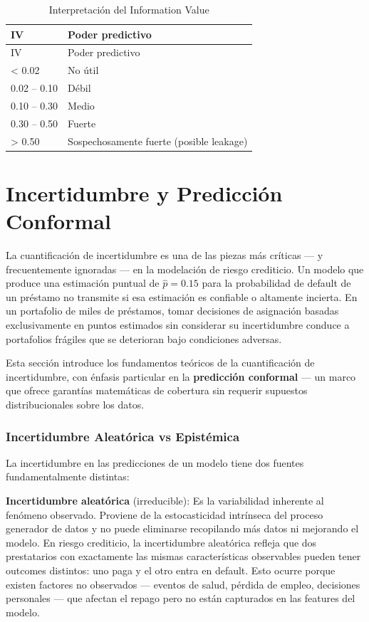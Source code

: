 \documentclass[
  spanish,
  11pt,
  letterpaper,
]{scrbook}
\theoremstyle{plain}
\theoremstyle{remark}
\begin{document}
\begin{longtable}[]{@{}ll@{}}
\caption{Interpretación del Information
Value}\label{tbl-iv-interpretation}\tabularnewline
\toprule\noalign{}
IV & Poder predictivo \\
\midrule\noalign{}
\endfirsthead
\toprule\noalign{}
IV & Poder predictivo \\
\midrule\noalign{}
\endhead
\bottomrule\noalign{}
\endlastfoot
\textless{} 0.02 & No útil \\
0.02 -- 0.10 & Débil \\
0.10 -- 0.30 & Medio \\
0.30 -- 0.50 & Fuerte \\
\textgreater{} 0.50 & Sospechosamente fuerte (posible leakage) \\
\end{longtable}

\chapter{Incertidumbre y Predicción
Conformal}\label{sec-uncertainty-conformal}

La cuantificación de incertidumbre es una de las piezas más críticas ---
y frecuentemente ignoradas --- en la modelación de riesgo crediticio. Un
modelo que produce una estimación puntual de \(\hat{p} = 0.15\) para la
probabilidad de default de un préstamo no transmite si esa estimación es
confiable o altamente incierta. En un portafolio de miles de préstamos,
tomar decisiones de asignación basadas exclusivamente en puntos
estimados sin considerar su incertidumbre conduce a portafolios frágiles
que se deterioran bajo condiciones adversas.

Esta sección introduce los fundamentos teóricos de la cuantificación de
incertidumbre, con énfasis particular en la \textbf{predicción
conformal} --- un marco que ofrece garantías matemáticas de cobertura
sin requerir supuestos distribucionales sobre los datos.

\subsection{Incertidumbre Aleatórica vs
Epistémica}\label{sec-aleatoric-epistemic}

La incertidumbre en las predicciones de un modelo tiene dos fuentes
fundamentalmente distintas:

\textbf{Incertidumbre aleatórica} (irreducible): Es la variabilidad
inherente al fenómeno observado. Proviene de la estocasticidad
intrínseca del proceso generador de datos y no puede eliminarse
recopilando más datos ni mejorando el modelo. En riesgo crediticio, la
incertidumbre aleatórica refleja que dos prestatarios con exactamente
las mismas características observables pueden tener outcomes distintos:
uno paga y el otro entra en default. Esto ocurre porque existen factores
no observados --- eventos de salud, pérdida de empleo, decisiones
personales --- que afectan el repago pero no están capturados en las
features del modelo.
\end{document}
